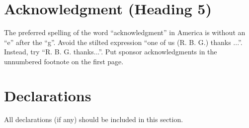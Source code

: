 \documentclass[conference, letterpaper]{IEEEtran}
\begin{document}
\section*{Acknowledgment (Heading 5)}
The preferred spelling of the word “acknowledgment” in America is without an “e” after the “g”. Avoid the stilted expression “one of us (R. B. G.) thanks ...”.  Instead, try “R. B. G. thanks...”. Put sponsor acknowledgments in the unnumbered footnote on the first page.

\section*{Declarations}
All declarations (if any) should be included in this section.



%
%
%
\end{document}
